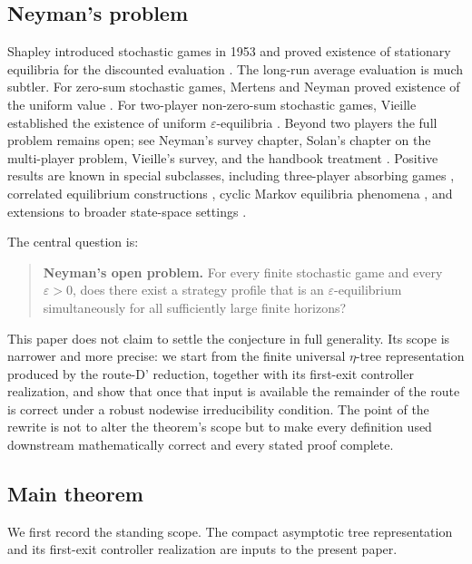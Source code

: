 \documentclass[12pt]{article}
\theoremstyle{definition}
\newcommand{\eps}{\varepsilon}
\newcommand{\1}{\mathbf{1}}
\begin{document}
\subsection{Neyman's problem}

Shapley introduced stochastic games in 1953 and proved existence of stationary
equilibria for the discounted evaluation \cite{Shapley1953}. The long-run average
evaluation is much subtler. For zero-sum stochastic games, Mertens and Neyman
proved existence of the uniform value \cite{MertensNeyman1981}. For two-player
non-zero-sum stochastic games, Vieille established the existence of uniform
$\eps$-equilibria \cite{Vieille2000I,Vieille2000II}. Beyond two players the full
problem remains open; see Neyman's survey chapter, Solan's chapter on the
multi-player problem, Vieille's survey, and the handbook treatment
\cite{Neyman2003,Solan2003,Vieille2002,MertensSorinZamir2003}. Positive results
are known in special subclasses, including three-player absorbing games
\cite{Solan1999}, correlated equilibrium constructions \cite{SolanVieille2002},
cyclic Markov equilibria phenomena \cite{FleschThuijsmanVrieze1997}, and extensions
to broader state-space settings \cite{Nowak2003}.

The central question is:
\begin{quote}
\textbf{Neyman's open problem.}
For every finite stochastic game and every $\eps>0$, does there exist a strategy
profile that is an $\eps$-equilibrium simultaneously for all sufficiently large
finite horizons?
\end{quote}

This paper does not claim to settle the conjecture in full generality. Its scope
is narrower and more precise: we start from the finite universal $\eta$-tree
representation produced by the route-D' reduction, together with its first-exit
controller realization, and show that once that input is available the remainder
of the route is correct under a robust nodewise irreducibility condition. The
point of the rewrite is not to alter the theorem's scope but to make every
definition used downstream mathematically correct and every stated proof complete.

\subsection{Main theorem}

We first record the standing scope. The compact asymptotic tree representation and
its first-exit controller realization are inputs to the present paper.
\end{document}

